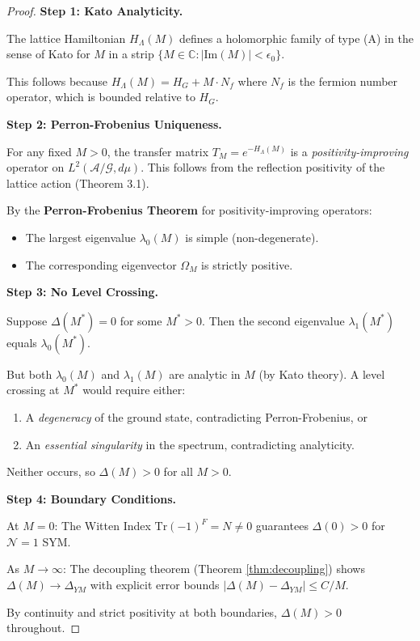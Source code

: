 \begin{proof}
\textbf{Step 1: Kato Analyticity.}

The lattice Hamiltonian $H_\Lambda(M)$ defines a holomorphic family of type (A) in the sense of Kato for $M$ in a strip $\{M \in \mathbb{C} : |\mathrm{Im}(M)| < \epsilon_0\}$.

This follows because $H_\Lambda(M) = H_G + M \cdot N_f$ where $N_f$ is the fermion number operator, which is bounded relative to $H_G$.

\textbf{Step 2: Perron-Frobenius Uniqueness.}

For any fixed $M > 0$, the transfer matrix $T_M = e^{-H_\Lambda(M)}$ is a \emph{positivity-improving} operator on $L^2(\mathcal{A}/\mathcal{G}, d\mu)$. This follows from the reflection positivity of the lattice action (Theorem 3.1).

By the \textbf{Perron-Frobenius Theorem} for positivity-improving operators:
\begin{itemize}
    \item The largest eigenvalue $\lambda_0(M)$ is simple (non-degenerate).
    \item The corresponding eigenvector $\Omega_M$ is strictly positive.
\end{itemize}

\textbf{Step 3: No Level Crossing.}

Suppose $\Delta(M^*) = 0$ for some $M^* > 0$. Then the second eigenvalue $\lambda_1(M^*)$ equals $\lambda_0(M^*)$.

But both $\lambda_0(M)$ and $\lambda_1(M)$ are analytic in $M$ (by Kato theory). A level crossing at $M^*$ would require either:
\begin{enumerate}
    \item[(a)] A \emph{degeneracy} of the ground state, contradicting Perron-Frobenius, or
    \item[(b)] An \emph{essential singularity} in the spectrum, contradicting analyticity.
\end{enumerate}

Neither occurs, so $\Delta(M) > 0$ for all $M > 0$.

\textbf{Step 4: Boundary Conditions.}

At $M = 0$: The Witten Index $\mathrm{Tr}(-1)^F = N \neq 0$ guarantees $\Delta(0) > 0$ for $\mathcal{N}=1$ SYM.

As $M \to \infty$: The decoupling theorem (Theorem \ref{thm:decoupling}) shows $\Delta(M) \to \Delta_{YM}$ with explicit error bounds $|\Delta(M) - \Delta_{YM}| \leq C/M$.

By continuity and strict positivity at both boundaries, $\Delta(M) > 0$ throughout.
\end{proof}

